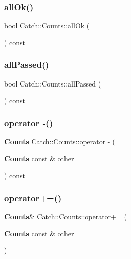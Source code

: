 \subsubsection{allOk()}
{\footnotesize\ttfamily bool Catch\+::\+Counts\+::all\+Ok (\begin{DoxyParamCaption}{ }\end{DoxyParamCaption}) const}

\mbox{\label{struct_catch_1_1_counts_a84999490e0ecaa3de5e121bf48eda1b3}} 
\subsubsection{allPassed()}
{\footnotesize\ttfamily bool Catch\+::\+Counts\+::all\+Passed (\begin{DoxyParamCaption}{ }\end{DoxyParamCaption}) const}

\mbox{\label{struct_catch_1_1_counts_a954a6bf7a975467774c5f2795bbda0ac}} 
\subsubsection{operator -\/()}
{\footnotesize\ttfamily \textbf{ Counts} Catch\+::\+Counts\+::operator -\/ (\begin{DoxyParamCaption}\item[{\textbf{ Counts} const \&}]{other }\end{DoxyParamCaption}) const}

\mbox{\label{struct_catch_1_1_counts_a322a89475cd2cc039140ef371e973677}} 
\subsubsection{operator+=()}
{\footnotesize\ttfamily \textbf{ Counts}\& Catch\+::\+Counts\+::operator+= (\begin{DoxyParamCaption}\item[{\textbf{ Counts} const \&}]{other }\end{DoxyParamCaption})}

\mbox{\label{struct_catch_1_1_counts_a94f969c09cf52d1339c085c9603cd1d3}} 
